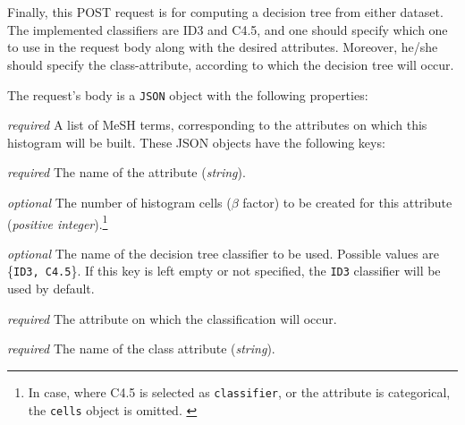 \section[/smpc/decisionTree POST request]{\protect{}}\label{s:post3}
Finally, this POST request is for computing a decision tree from either dataset.
The implemented classifiers are ID3 and C4.5, and one should specify which one to use in the request body along with the desired attributes.
Moreover, he/she should specify the class-attribute, according to which the decision tree will occur.
\begin{description}[labelwidth=5em, leftmargin=\dimexpr\labelwidth+\labelsep\relax]
     \item[Request:] The request's body is a \texttt{JSON} object with the following properties:

\begin{description}[labelwidth=9em, leftmargin=\dimexpr\labelwidth+\labelsep\relax]

    \item[\texttt{attributes}:] {\color{red}\textit{required}} A list of MeSH terms, corresponding to the attributes on which this histogram will be built.
    These JSON objects have the following keys:

    \begin{description}[labelwidth=3em, leftmargin=\dimexpr\labelwidth+\labelsep\relax]
        \item[\texttt{name}:] {\color{red}\textit{required}} The name of the attribute (\textit{string}).

        \item[\texttt{cells}:] {\color{blue}\textit{optional}} The number of histogram cells ($\beta$ factor) to be created for this attribute (\textit{positive integer}).\footnote{In case, where C4.5 is selected as \texttt{classifier}, or the attribute is categorical, the \texttt{cells} object is omitted. \label{refnote1}}
    \end{description}

    \item[\texttt{classifier}:] {\color{blue}\textit{optional}} The name of the decision tree classifier to be used.
    Possible values are \{\texttt{ID3, C4.5}\}.
    If this key is left empty or not specified, the \texttt{ID3} classifier will be used by default.

    \item[\texttt{class\_attribute}:] {\color{red}\textit{required}} The attribute on which the classification will occur.
    \begin{description}[labelwidth=3em, leftmargin=\dimexpr\labelwidth+\labelsep\relax]
        \item[\texttt{name}:] {\color{red}\textit{required}} The name of the class attribute (\textit{string}).


\end{description}
\end{description}
\end{description}
